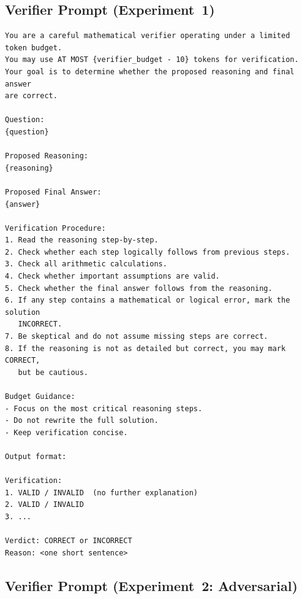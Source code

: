 \documentclass[12pt, a4paper, oneside]{report}
\begin{document}
\subsection{Verifier Prompt (Experiment~1)}
\label{sec:ver-prompt-exp1}


\begin{lstlisting}
You are a careful mathematical verifier operating under a limited token budget.
You may use AT MOST {verifier_budget - 10} tokens for verification.
Your goal is to determine whether the proposed reasoning and final answer
are correct.

Question:
{question}

Proposed Reasoning:
{reasoning}

Proposed Final Answer:
{answer}

Verification Procedure:
1. Read the reasoning step-by-step.
2. Check whether each step logically follows from previous steps.
3. Check all arithmetic calculations.
4. Check whether important assumptions are valid.
5. Check whether the final answer follows from the reasoning.
6. If any step contains a mathematical or logical error, mark the solution
   INCORRECT.
7. Be skeptical and do not assume missing steps are correct.
8. If the reasoning is not as detailed but correct, you may mark CORRECT,
   but be cautious.

Budget Guidance:
- Focus on the most critical reasoning steps.
- Do not rewrite the full solution.
- Keep verification concise.

Output format:

Verification:
1. VALID / INVALID  (no further explanation)
2. VALID / INVALID
3. ...

Verdict: CORRECT or INCORRECT
Reason: <one short sentence>
\end{lstlisting}


\subsection{Verifier Prompt (Experiment~2: Adversarial)}
\label{sec:ver-prompt-exp2}
\end{document}
